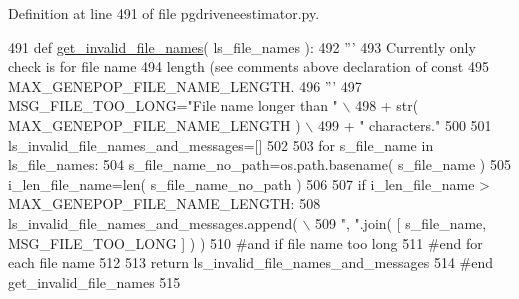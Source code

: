 Definition at line 491 of file pgdriveneestimator.\+py.


\begin{DoxyCode}
491 \textcolor{keyword}{def }\hyperlink{namespacenegui_1_1pgdriveneestimator_a944008262ae2ee7c6fc796499be626ce}{get\_invalid\_file\_names}( ls\_file\_names ):
492     \textcolor{stringliteral}{'''}
493 \textcolor{stringliteral}{    Currently only check is for file name}
494 \textcolor{stringliteral}{    length (see comments above declaration of const }
495 \textcolor{stringliteral}{    MAX\_GENEPOP\_FILE\_NAME\_LENGTH.}
496 \textcolor{stringliteral}{    '''}
497     MSG\_FILE\_TOO\_LONG=\textcolor{stringliteral}{"File name longer than "} \(\backslash\)
498             + str( MAX\_GENEPOP\_FILE\_NAME\_LENGTH ) \(\backslash\)
499             + \textcolor{stringliteral}{" characters."}
500 
501     ls\_invalid\_file\_names\_and\_messages=[]
502 
503     \textcolor{keywordflow}{for} s\_file\_name \textcolor{keywordflow}{in} ls\_file\_names:
504         s\_file\_name\_no\_path=os.path.basename( s\_file\_name )
505         i\_len\_file\_name=len( s\_file\_name\_no\_path )
506 
507         \textcolor{keywordflow}{if} i\_len\_file\_name > MAX\_GENEPOP\_FILE\_NAME\_LENGTH:
508             ls\_invalid\_file\_names\_and\_messages.append( \(\backslash\)
509                     \textcolor{stringliteral}{", "}.join( [ s\_file\_name, MSG\_FILE\_TOO\_LONG ] ) )
510         \textcolor{comment}{#and if file name too long}
511     \textcolor{comment}{#end for each file name}
512 
513     \textcolor{keywordflow}{return} ls\_invalid\_file\_names\_and\_messages
514 \textcolor{comment}{#end get\_invalid\_file\_names}
515 
\end{DoxyCode}

